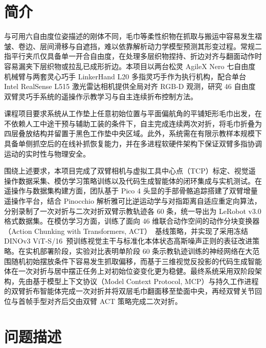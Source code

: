 \section{简介}
\label{sec:intro}

与可用六自由度位姿描述的刚体不同，毛巾等柔性织物在抓取与搬运中容易发生褶皱、卷边、层间滑移与自遮挡，难以依靠解析动力学模型预测其形变过程。常规二指平行夹爪仅具备单一开合自由度，在处理多层织物捏持、折边对齐与翻面动作时容易漏夹下层织物或拉乱已成形折边。本项目以两台松灵 AgileX Nero 七自由度机械臂与两套灵心巧手 LinkerHand L20 多指灵巧手作为执行机构，配合单台 Intel RealSense L515 激光雷达相机提供全局对齐 RGB-D 观测，研究 46 自由度双臂灵巧手系统的遥操作示教学习与自主连续折布控制方法。

课程项目要求系统从工作垫上任意初始位置与平面偏航角的平铺矩形毛巾出发，在不依赖人工中途干预与辅助工装的条件下，自主完成连续两次对折，将毛巾折叠为四层叠放结构并留置于黑色工作垫中央区域。此外，系统需在有限示教样本规模下具备单侧抓空后的在线补抓恢复能力，并在多进程软硬件架构下保证双臂多指协调运动的实时性与物理安全。

围绕上述要求，本项目完成了双臂相机与虚拟工具中心点（TCP）标定、视觉遥操作数据采集、模仿学习策略训练以及代码生成智能体的闭环集成与实机测试。在遥操作与数据集构建方面，团队基于 Pico 4 头显的手部骨骼追踪搭建了双臂增量遥操作平台，结合 Pinocchio 解析雅可比逆运动学与对指距离自适应重定向算法，分别录制了一次对折与二次对折双臂示教轨迹各 60 条，统一导出为 LeRobot v3.0 格式数据集。在模仿学习方面，训练了面向 46 维联合动作空间的动作分块变换器（Action Chunking with Transformers, ACT）~\cite{zhao2023learning}基线策略，并实现了采用冻结 DINOv3 ViT-S/16~\cite{simeoni2025dinov3}预训练视觉主干与标准化本体状态高斯噪声正则的表征改进策略。在实机部署阶段，实验对比表明单阶段 60 条示教轨迹训练的神经网络在大范围随机初始摆放条件下容易发生抓取偏移，而基于三维视觉反投影的代码生成智能体在一次对折与居中摆正任务上对初始位姿变化更为稳健。最终系统采用双阶段架构，先由基于模型上下文协议（Model Context Protocol, MCP）与持久工作进程的双臂折布智能体完成一次对折并将双层毛巾翻面移至垫面中央，再经双臂关节回位与首帧手型对齐后交由双臂 ACT 策略完成二次对折。


\section{问题描述}
\label{sec:problem}

